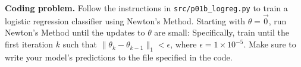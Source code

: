 \clearpage
\item {} \textbf{Coding problem.}
Follow the instructions in \texttt{src/p01b\_logreg.py} to train a
logistic regression classifier using Newton's Method.
Starting with $\theta = \vec{0}$, run Newton's Method until the updates to
$\theta$ are small: Specifically,  train until the first iteration $k$ such
that $\|\theta_{k} - \theta_{k-1}\|_1 < \epsilon$, where
$\epsilon = 1\times 10^{-5}$. Make sure to write your model's predictions to
the file specified in the code.

\ifnum{} {
  
} \fi
